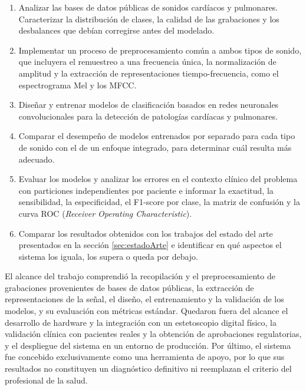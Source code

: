 \begin{enumerate}
	\item Analizar las bases de datos públicas de sonidos cardíacos y pulmonares. Caracterizar
		la distribución de clases, la calidad de las grabaciones y los desbalances que debían
		corregirse antes del modelado.
	\item Implementar un proceso de preprocesamiento común a ambos tipos de sonido, que
		incluyera el remuestreo a una frecuencia única, la normalización de amplitud y la extracción
		de representaciones tiempo-frecuencia, como el espectrograma Mel y los MFCC.
	\item Diseñar y entrenar modelos de clasificación basados en redes neuronales
		convolucionales para la detección de patologías cardíacas y pulmonares.
	\item Comparar el desempeño de modelos entrenados por separado para cada tipo de sonido con
		el de un enfoque integrado, para determinar cuál resulta más adecuado.
	\item Evaluar los modelos y analizar los errores en el contexto clínico del problema con
		particiones independientes por paciente e informar la exactitud, la sensibilidad, la
		especificidad, el F1-score por clase, la matriz de confusión y la curva ROC
		(\textit{Receiver Operating Characteristic}).
	\item Comparar los resultados obtenidos con los trabajos del estado del arte presentados en
		la sección \ref{sec:estadoArte} e identificar en qué aspectos el sistema los iguala, los
		supera o queda por debajo.
\end{enumerate}

El alcance del trabajo comprendió la recopilación y el preprocesamiento de grabaciones provenientes
de bases de datos públicas, la extracción de representaciones de la señal, el diseño, el
entrenamiento y la validación de los modelos, y su evaluación con métricas estándar. Quedaron fuera
del alcance el desarrollo de hardware y la integración con un estetoscopio digital físico, la
validación clínica con pacientes reales y la obtención de aprobaciones regulatorias, y el despliegue
del sistema en un entorno de producción. Por último, el sistema fue concebido exclusivamente como
una herramienta de apoyo, por lo que sus resultados no constituyen un diagnóstico definitivo ni
reemplazan el criterio del profesional de la salud.
